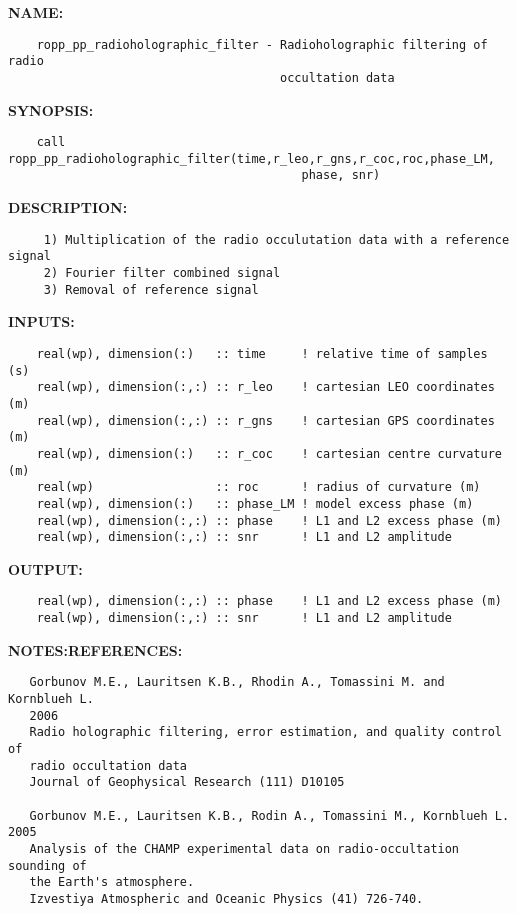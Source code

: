 \label{ch:robo83}
\label{ch:Preprocessing_ropp_pp_radioholographic_filter}
\textbf{NAME:}\hspace{0.08in}\begin{Verbatim}
    ropp_pp_radioholographic_filter - Radioholographic filtering of radio
                                      occultation data
\end{Verbatim}
\textbf{SYNOPSIS:}\hspace{0.08in}\begin{Verbatim}
    call ropp_pp_radioholographic_filter(time,r_leo,r_gns,r_coc,roc,phase_LM,
                                         phase, snr)
\end{Verbatim}
\textbf{DESCRIPTION:}\hspace{0.08in}\begin{Verbatim}
     1) Multiplication of the radio occulutation data with a reference signal 
     2) Fourier filter combined signal
     3) Removal of reference signal
\end{Verbatim}
\textbf{INPUTS:}\hspace{0.08in}\begin{Verbatim}
    real(wp), dimension(:)   :: time     ! relative time of samples (s)
    real(wp), dimension(:,:) :: r_leo    ! cartesian LEO coordinates (m)
    real(wp), dimension(:,:) :: r_gns    ! cartesian GPS coordinates (m)
    real(wp), dimension(:)   :: r_coc    ! cartesian centre curvature (m)
    real(wp)                 :: roc      ! radius of curvature (m)
    real(wp), dimension(:)   :: phase_LM ! model excess phase (m)
    real(wp), dimension(:,:) :: phase    ! L1 and L2 excess phase (m)
    real(wp), dimension(:,:) :: snr      ! L1 and L2 amplitude
\end{Verbatim}
\textbf{OUTPUT:}\hspace{0.08in}\begin{Verbatim}
    real(wp), dimension(:,:) :: phase    ! L1 and L2 excess phase (m)
    real(wp), dimension(:,:) :: snr      ! L1 and L2 amplitude
\end{Verbatim}
\textbf{NOTES:}\hspace{0.08in}\textbf{REFERENCES:}\hspace{0.08in}\begin{Verbatim}
   Gorbunov M.E., Lauritsen K.B., Rhodin A., Tomassini M. and Kornblueh L. 
   2006
   Radio holographic filtering, error estimation, and quality control of 
   radio occultation data
   Journal of Geophysical Research (111) D10105

   Gorbunov M.E., Lauritsen K.B., Rodin A., Tomassini M., Kornblueh L. 2005 
   Analysis of the CHAMP experimental data on radio-occultation sounding of
   the Earth's atmosphere.
   Izvestiya Atmospheric and Oceanic Physics (41) 726-740.
\end{Verbatim}
